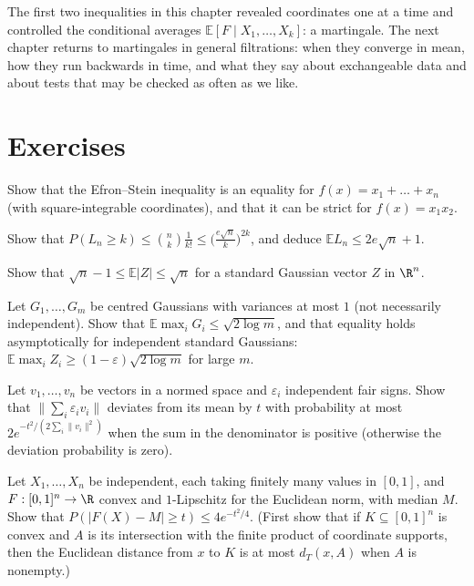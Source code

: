 The first two inequalities in this chapter revealed coordinates one at a time and controlled the conditional averages $\mathbb E[F\mid X_1,\dots,X_k]$: a martingale. The next chapter returns to martingales in general filtrations: when they converge in mean, how they run backwards in
time, and what they say about exchangeable data and about tests that may be checked as often as we like.

\section{Exercises}

\begin{exercise}[$\star$]\label{ex:esequality}
Show that the Efron--Stein inequality is an equality for $f(x)=x_1+\dots+x_n$ (with square-integrable coordinates), and that it can be strict for $f(x)=x_1x_2$.
\end{exercise}

\begin{exercise}[$\star$]\label{ex:lismean}
Show that $P(L_n\ge k)\le\binom nk\frac1{k!}\le\bigl(\frac{e\sqrt n}k\bigr)^{2k}$, and deduce $\mathbb EL_n\le2e\sqrt n+1$.
\end{exercise}

\begin{exercise}[$\star$]\label{ex:thinshellmean}
Show that $\sqrt n-1\le\mathbb E|Z|\le\sqrt n$ for a standard Gaussian vector $Z$ in $\R^n$.
\end{exercise}

\begin{exercise}[$\star\star$]\label{ex:maxmean}
Let $G_1,\dots,G_m$ be centred Gaussians with variances at most $1$ (not necessarily independent). Show that $\mathbb E\max_iG_i\le\sqrt{2\log m}$, and that equality holds asymptotically
for independent standard Gaussians: $\mathbb E\max_iZ_i\ge(1-\varepsilon)\sqrt{2\log m}$ for large $m$.
\end{exercise}

\begin{exercise}[$\star\star$]\label{ex:rademachersum}
Let $v_1,\dots,v_n$ be vectors in a normed space and $\varepsilon_i$ independent fair signs. Show that $\|\sum_i\varepsilon_iv_i\|$ deviates from its mean by $t$ with probability at most
$2e^{-t^2/(2\sum_i\|v_i\|^2)}$ when the sum in the denominator is positive (otherwise the deviation probability is zero).
\end{exercise}

\begin{exercise}[$\star\star\star$]\label{ex:convexlip}
Let $X_1,\dots,X_n$ be independent, each taking finitely many values in $[0,1]$, and $F:[0,1]^n\to\R$ convex and $1$-Lipschitz for the Euclidean norm, with median $M$. Show that
$P(|F(X)-M|\ge t)\le4e^{-t^2/4}$. (First show that if $K\subseteq[0,1]^n$ is convex and $A$ is its intersection with the finite product of coordinate supports, then the Euclidean distance from $x$ to $K$ is at most $d_T(x,A)$ when $A$ is nonempty.)
\end{exercise}


